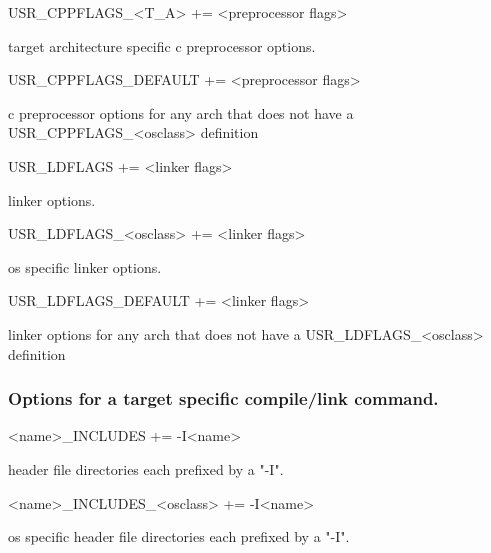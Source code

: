 \begin{description}\item USR\_CPPFLAGS\_\textless{}T\_A\textgreater{} += \textless{}preprocessor flags\textgreater{}

\end{description}target architecture specific c preprocessor options.

\begin{description}\item USR\_CPPFLAGS\_DEFAULT += \textless{}preprocessor flags\textgreater{}

\end{description}c preprocessor options for any arch that does not have a USR\_CPPFLAGS\_\textless{}osclass\textgreater{} definition

\begin{description}\item {}USR\_LDFLAGS += \textless{}linker flags\textgreater{}

\end{description}linker options.

\begin{description}\item USR\_LDFLAGS\_\textless{}osclass\textgreater{} += \textless{}linker flags\textgreater{}

\end{description}os specific linker options.

\begin{description}\item USR\_LDFLAGS\_DEFAULT += \textless{}linker flags\textgreater{}

\end{description}linker options for any arch that does not have a USR\_LDFLAGS\_\textless{}osclass\textgreater{} definition

\subsubsection{Options for a target specific compile/link command.}

\begin{description}\item \textless{}name\textgreater{}\_INCLUDES += -I\textless{}name\textgreater{}

\end{description}header file directories each prefixed by a "-I".

\begin{description}\item \textless{}name\textgreater{}\_INCLUDES\_\textless{}osclass\textgreater{} += -I\textless{}name\textgreater{}

\end{description}os specific header file directories each prefixed by a "-I".

